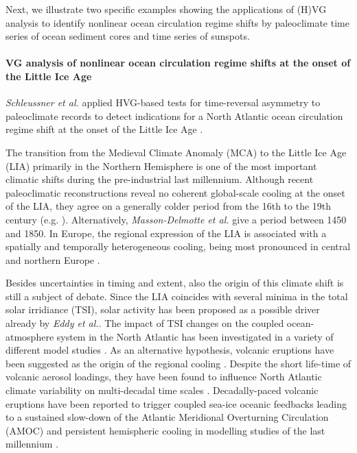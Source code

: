 		Next, we illustrate two specific examples showing the applications of (H)VG analysis to identify nonlinear ocean circulation regime shifts by paleoclimate time series of ocean sediment cores and time series of sunspots.

		\paragraph{VG analysis of nonlinear ocean circulation regime shifts at the onset of the Little Ice Age} \textit{Schleussner et al.} applied HVG-based tests for time-reversal asymmetry to paleoclimate records to detect indications for a North Atlantic ocean circulation regime shift at the onset of the Little Ice Age \cite{schleussner2015indications}.

		The transition from the Medieval Climate Anomaly (MCA) to the Little Ice Age (LIA) primarily in the  Northern Hemisphere is one of the most important climatic shifts during the pre-industrial last millennium. Although recent paleoclimatic reconstructions reveal no coherent global-scale cooling at the onset of the LIA, they agree on a generally colder period from the 16th to the 19th century (e.g. \cite{Pages2K2013}). Alternatively, \textit{Masson-Delmotte et al.} \cite{IPCC_AR5_WG5_Ch5} give a period between 1450 and 1850. In Europe, the regional expression of the LIA is associated with a spatially and temporally heterogeneous cooling, being most pronounced in central and northern Europe \cite{buentgen_tegel11,Pages2K2013}.

		Besides uncertainties in timing and extent, also the origin of this climate shift is still a subject of debate. Since the LIA coincides with several minima in the total solar irridiance (TSI), solar activity has been proposed as a possible driver already by \textit{Eddy et al.}\cite{eddy76}. The impact of TSI changes on the coupled ocean-atmosphere system in the North Atlantic has been investigated in a variety of different model studies \cite{crowley00,zorita_storch04,swingedouw_terray12}. As an alternative hypothesis, volcanic eruptions have been suggested as the origin of the regional cooling \cite{robock79,crowley00}. Despite the short life-time of volcanic aerosol loadings, they have been found to influence North Atlantic climate variability on multi-decadal time scales \cite{ottera_bentsen10,fischer_luterbacher07,zanchettin_timmreck11,goosse_crespin12}. Decadally-paced volcanic eruptions have been reported to trigger coupled sea-ice oceanic feedbacks leading to a sustained slow-down of the Atlantic Meridional Overturning Circulation (AMOC) and persistent hemispheric cooling in modelling studies of the last millennium \cite{miller_geirsdottir12,schleussner_feulner13}.

